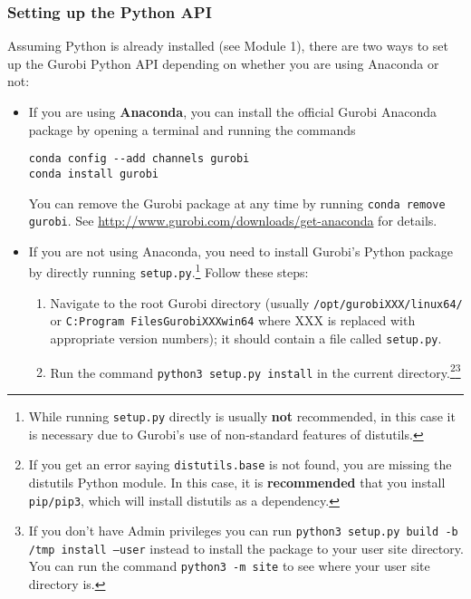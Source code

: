 \documentclass[12pt]{article}
\begin{document}
\subsubsection{Setting up the Python API}
Assuming Python is already installed (see Module 1), there are two ways to set up the Gurobi Python API depending on whether you are using Anaconda or not:
\begin{itemize}
    \item If you are using \textbf{Anaconda}, you can install the official Gurobi Anaconda package by opening a terminal and running the commands
\begin{verbatim}
conda config --add channels gurobi
conda install gurobi
\end{verbatim}
        You can remove the Gurobi package at any time by running \texttt{conda remove gurobi}.
        See \url{http://www.gurobi.com/downloads/get-anaconda} for details.
    \item If you are not using Anaconda, you need to install Gurobi's Python package by directly running \texttt{setup.py}.\footnote{
        While running \texttt{setup.py} directly is usually \textbf{not} recommended, in this case it is necessary due to Gurobi's use of non-standard features of distutils.
        }
        Follow these steps:
        \begin{enumerate}
            \item Navigate to the root Gurobi directory (usually \texttt{/opt/gurobiXXX/linux64/} or \texttt{C:Program FilesGurobiXXXwin64} where XXX is replaced with appropriate version numbers); it should contain a file called \texttt{setup.py}.
            \item Run the command \texttt{python3 setup.py install} in the current directory.\footnote{
                If you get an error saying \texttt{distutils.base} is not found, you are missing the distutils Python module.
                In this case, it is \textbf{recommended} that you install \texttt{pip/pip3}, which will install distutils as a dependency.
                }\footnote{
                    If you don't have Admin privileges you can run \texttt{python3 setup.py build -b /tmp install --user} instead to install the package to your user site directory. 
                    You can run the command \texttt{python3 -m site} to see where your user site directory is.
                }
        \end{enumerate}
\end{itemize}
\end{document}
